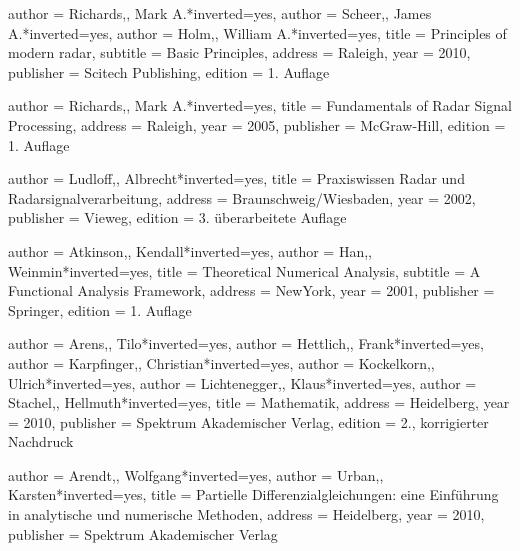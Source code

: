 
\begin{bibdiv}
\begin{biblist}

 {
    author = {{Richards,}, Mark A.}*{inverted={yes}},
    author = {{Scheer,}, James A.}*{inverted={yes}},
    author = {{Holm,}, William A.}*{inverted={yes}},
    title = {Principles of modern radar},
    subtitle = {Basic Principles},
    address = {Raleigh},
    year = {2010},
    publisher = {Scitech Publishing},
    edition = {1. Auflage}
}

 {
    author = {{Richards,}, Mark A.}*{inverted={yes}},
    title = {Fundamentals of Radar Signal Processing},
    address = {Raleigh},
    year = {2005},
    publisher = {McGraw-Hill},
    edition = {1. Auflage}
}

 {
    author = {{Ludloff,}, Albrecht}*{inverted={yes}},
    title = {Praxiswissen Radar und Radarsignalverarbeitung},
    address = {Braunschweig/Wiesbaden},
    year = {2002},
    publisher = {Vieweg},
    edition = {3. überarbeitete Auflage}
}


 {
    author = {{Atkinson,}, Kendall}*{inverted={yes}},
    author = {{Han,}, Weinmin}*{inverted={yes}},
    title = {Theoretical Numerical Analysis},
    subtitle = {A Functional Analysis Framework},
    address = {NewYork},
    year = {2001},
    publisher = {Springer},
    edition = {1. Auflage}
}

 {
    author = {{Arens,}, Tilo}*{inverted={yes}},
    author = {{Hettlich,}, Frank}*{inverted={yes}},
    author = {{Karpfinger,}, Christian}*{inverted={yes}},
    author = {{Kockelkorn,}, Ulrich}*{inverted={yes}},
    author = {{Lichtenegger,}, Klaus}*{inverted={yes}},
    author = {{Stachel,}, Hellmuth}*{inverted={yes}},
    title = {Mathematik},
    address = {Heidelberg},
    year = {2010},
    publisher = {Spektrum Akademischer Verlag},
    edition = {2., korrigierter Nachdruck}
}

 {
    author = {{Arendt,}, Wolfgang}*{inverted={yes}},
    author = {{Urban,}, Karsten}*{inverted={yes}},
    title = {Partielle Differenzialgleichungen: eine Einführung in analytische und numerische Methoden},
    address = {Heidelberg},
    year = {2010},
    publisher = {Spektrum Akademischer Verlag}
}



\end{biblist}
\end{bibdiv}
